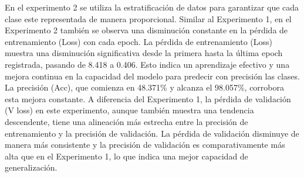   En el experimento 2 se utiliza la estratificación de datos para garantizar que cada clase este representada de manera proporcional. Similar al Experimento 1, en el Experimento 2 también se observa una disminución constante en la pérdida de entrenamiento (Loss) con cada epoch. La pérdida de entrenamiento (Loss) muestra una disminución significativa desde la primera hasta la última epoch registrada, pasando de 8.418 a 0.406. Esto indica un aprendizaje efectivo y una mejora continua en la capacidad del modelo para predecir con precisión las clases. La precisión (Acc), que comienza en 48.371\% y alcanza el 98.057\%, corrobora esta mejora constante. A diferencia del Experimento 1, la pérdida de validación (V loss) en este experimento, aunque también muestra una tendencia descendente, tiene una alineación más estrecha entre la precisión de entrenamiento y la precisión de validación. La pérdida de validación disminuye de manera más consistente y la precisión de validación es comparativamente más alta que en el Experimento 1, lo que indica una mejor capacidad de generalización.
    
